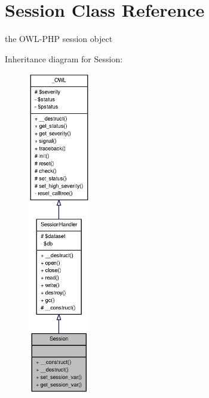 \section{Session Class Reference}
\label{classSession}


the OWL-\/PHP session object  




Inheritance diagram for Session:\nopagebreak
\begin{figure}[H]
\begin{center}
\leavevmode
\includegraphics[height=400pt]{classSession__inherit__graph}
\end{center}
\end{figure}


